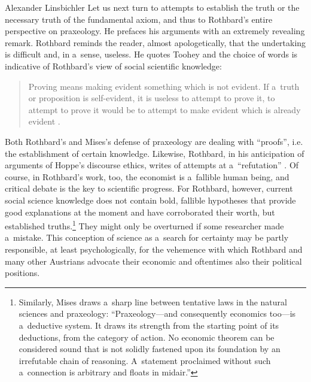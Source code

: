 \begin{artengenv}{Alexander Linsbichler}
Let us next turn to attempts to establish the truth or the necessary truth of the fundamental axiom, and thus to Rothbard's entire perspective on praxeology. He prefaces his arguments with an extremely revealing remark. Rothbard reminds the reader, almost apologetically, that the undertaking is difficult and, in a~sense, useless. He quotes Toohey and the choice of words is indicative of Rothbard's view of social scientific knowledge:



\begin{quote}
Proving means making evident something which is not evident. If a~truth or proposition is self-evident, it is useless to attempt to prove it, to attempt to prove it would be to attempt to make evident which is already evident 
\parencite[][p.28]{rothbard_praxeology:_1976}.%
\end{quote}




Both Rothbard's and Mises's defense of praxeology are dealing with ``proofs'', i.e. the establishment of certain knowledge. Likewise, Rothbard, in his anticipation of arguments of Hoppe's discourse ethics, writes of attempts at a~``refutation'' 
\parencite[][pp.28–29]{rothbard_praxeology:_1976}. %
 Of course, in Rothbard's work, too, the economist is a~fallible human being, and critical debate is the key to scientific progress. For Rothbard, however, current social science knowledge does not contain bold, fallible hypotheses that provide good explanations at the moment and have corroborated their worth, but established truths.\footnote{Similarly, Mises 
\parencite*[][p.68]{mises_human_1998} %
 draws a~sharp line between tentative laws in the natural sciences and praxeology: ``Praxeology---and consequently economics too---is a~deductive system. It draws its strength from the starting point of its deductions, from the category of action. No economic theorem can be considered sound that is not solidly fastened upon its foundation by an irrefutable chain of reasoning. A~statement proclaimed without such a~connection is arbitrary and floats in midair.''} They might only be overturned if some researcher made a~mistake. This conception of science as a~search for certainty may be partly responsible, at least psychologically, for the vehemence with which Rothbard and many other Austrians advocate their economic and oftentimes also their political positions.




\end{artengenv}
